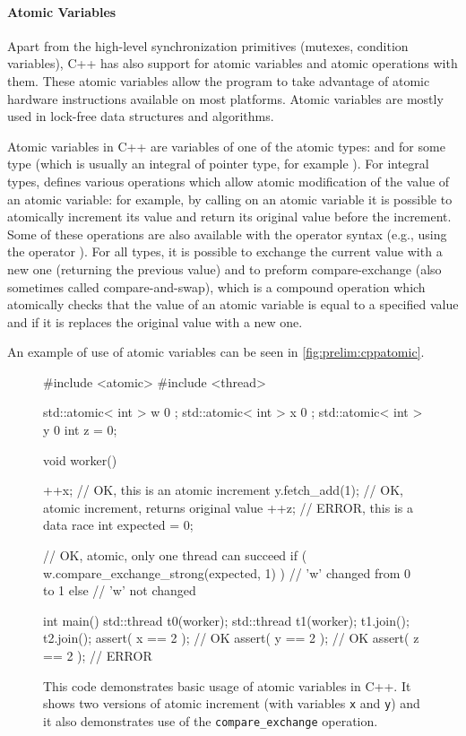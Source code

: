\paragraph{Atomic Variables}

Apart from the high-level synchronization primitives (mutexes, condition
variables), C++ has also support for atomic variables and atomic operations
with them.
These atomic variables allow the program to take advantage of atomic hardware
instructions available on most platforms.
Atomic variables are mostly used in lock-free data structures and algorithms.

Atomic variables in C++ are variables of one of the atomic types:
 and  for some type  (which is
usually an integral of pointer type, for example ).
For integral types,  defines various operations which allow
atomic modification of the value of an atomic variable: for example, by calling
 on an atomic variable it is possible to atomically increment
its value and return its original value before the increment.
Some of these operations are also available with the operator syntax (e.g.,
using the operator \cpp{+=}).
For all types, it is possible to exchange the current value with a new one
(returning the previous value) and to preform compare-exchange (also sometimes
called compare-and-swap), which is a compound operation which atomically checks
that the value of an atomic variable is equal to a specified value and if it is
replaces the original value with a new one.

An example of use of atomic variables can be seen in
\autoref{fig:prelim:cppatomic}.

\begin{figure}[tp]
    \begin{cppcode}
        #include <atomic>
        #include <thread>

        std::atomic< int > w { 0 };
        std::atomic< int > x { 0 };
        std::atomic< int > y { 0 }
        int z = 0;

        void worker() {
            ++x; // OK, this is an atomic increment
            y.fetch_add(1); // OK, atomic increment, returns original value
            ++z; // ERROR, this is a data race
            int expected = 0;

            // OK, atomic, only one thread can succeed
            if ( w.compare_exchange_strong(expected, 1) ) {
                // 'w' changed from 0 to 1
            } else {
                // 'w' not changed
            }
        }

        int main() {
            std::thread t0(worker);
            std::thread t1(worker);
            t1.join();
            t2.join();
            assert( x == 2 ); // OK
            assert( y == 2 ); // OK
            assert( z == 2 ); // ERROR
        }
    \end{cppcode}
    \caption{This code demonstrates basic usage of atomic variables in C++.
    It shows two versions of atomic increment (with variables \texttt{x} and
    \texttt{y}) and it also demonstrates use of the \texttt{compare\_exchange}
    operation.
    }\label{fig:prelim:cppatomic}
\end{figure}

